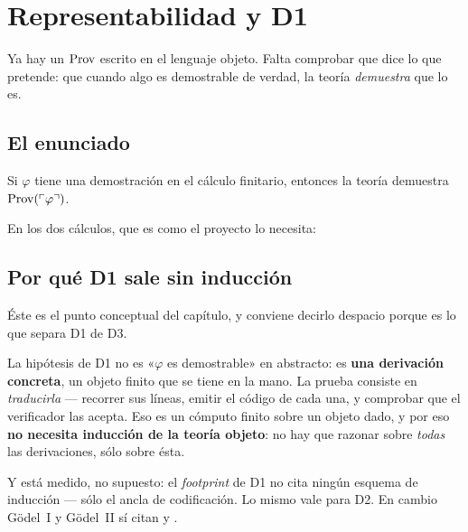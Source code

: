 \chapter{Representabilidad y D1}
\label{cap:d1}

Ya hay un $\operatorname{Prov}$ escrito en el lenguaje objeto. Falta comprobar que dice lo que pretende: que
cuando algo es demostrable de verdad, la teoría \emph{demuestra} que lo es.

\section{El enunciado}

\begin{teorema}
Si $\varphi$ tiene una demostración en el cálculo finitario, entonces la teoría demuestra
$\operatorname{Prov}(\ulcorner \varphi \urcorner)$.
\end{teorema}

\noindent En los dos cálculos, que es como el proyecto lo necesita:



\section{Por qué D1 sale sin inducción}

Éste es el punto conceptual del capítulo, y conviene decirlo despacio porque es lo que separa D1 de
D3.

\begin{leccion}
La hipótesis de D1 no es «$\varphi$ es demostrable» en abstracto: es \textbf{una derivación
concreta}, un objeto finito que se tiene en la mano. La prueba consiste en \emph{traducirla} —
recorrer sus líneas, emitir el código de cada una, y comprobar que el verificador las acepta. Eso es
un cómputo finito sobre un objeto dado, y por eso \textbf{no necesita inducción de la teoría
objeto}: no hay que razonar sobre \emph{todas} las derivaciones, sólo sobre ésta.
\end{leccion}

Y está medido, no supuesto: el \emph{footprint} de D1 no cita ningún esquema de inducción — sólo el
ancla de codificación. Lo mismo vale para D2. En cambio Gödel~I y Gödel~II sí citan
 y .

